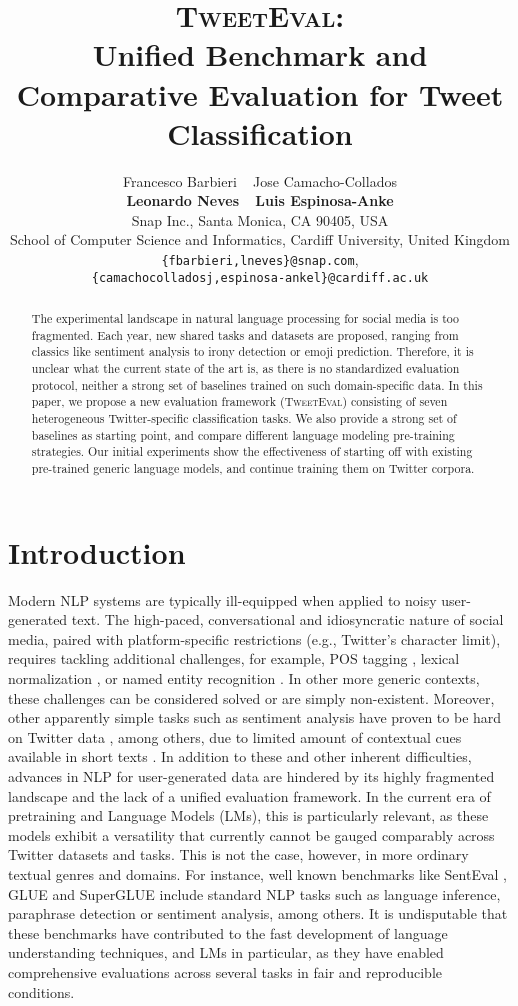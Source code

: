 \documentclass[11pt,a4paper]{article}
\title{\textsc{TweetEval}: \\ Unified Benchmark and Comparative Evaluation for Tweet Classification}
\author{
 Francesco Barbieri ~ Jose Camacho-Collados \\
 \textbf{Leonardo Neves} ~ \textbf{Luis Espinosa-Anke}  \vspace{0.1cm} \\
Snap Inc., Santa Monica, CA 90405, USA\\
School of Computer Science and Informatics, Cardiff University, United Kingdom \vspace{0.1cm} \\
{ \tt \{fbarbieri,lneves\}@snap.com},\\
{  \tt \{camachocolladosj,espinosa-ankel\}@cardiff.ac.uk}\\ 
}
\date{}
\begin{document}
\maketitle
\begin{abstract}

The experimental landscape in natural language processing for social media is too fragmented. Each year, new shared tasks and datasets are proposed, ranging from classics like sentiment analysis to irony detection or emoji prediction. 
Therefore, it is unclear what the current state of the art is, as there is no standardized evaluation protocol, neither a strong set of baselines trained on such domain-specific data. In this paper,
we propose a new evaluation framework (\textsc{TweetEval}) consisting of seven heterogeneous Twitter-specific classification tasks. We also provide a strong set of baselines as starting point, and compare different language modeling pre-training strategies. Our initial experiments show the effectiveness of starting off with existing pre-trained generic language models, and continue training them on Twitter corpora. 

\end{abstract}




\section{Introduction}

Modern NLP systems are typically ill-equipped when applied to noisy user-generated text. The high-paced, conversational and idiosyncratic nature of social media, paired with platform-specific restrictions (e.g., Twitter's character limit), requires tackling additional challenges, for example, POS tagging \cite{derczynski-etal-2013-twitter}, lexical normalization \cite{han2011lexical,baldwin2015shared}, or named entity recognition \cite{ritter2011named,baldwin-etal-2013-noisy}. In other more generic contexts, these challenges can be considered solved or are simply non-existent. Moreover, other apparently simple tasks such as sentiment analysis have proven to be hard on Twitter data \cite{poria2020beneath}, among others, due to limited amount of contextual cues available in short texts \cite{kim2014sociolinguistic}.
In addition to these and other inherent difficulties, advances in NLP for user-generated data are hindered by its highly fragmented landscape and the lack of a unified evaluation framework. In the current era of pretraining and Language Models (LMs), this is particularly relevant, as these models exhibit a versatility that currently cannot be gauged comparably across Twitter datasets and tasks. This is not the case, however, in more ordinary textual genres and domains. For instance, well known benchmarks like SentEval \cite{conneau-kiela-2018-senteval}, GLUE \cite{wang2019glue} and SuperGLUE \cite{wang2019superglue} include standard NLP tasks such as language inference, paraphrase detection or sentiment analysis, among others. It is undisputable that these benchmarks have contributed to the fast development of language understanding techniques, and LMs in particular, as they have enabled comprehensive evaluations across several tasks in fair and reproducible conditions.
\end{document}
